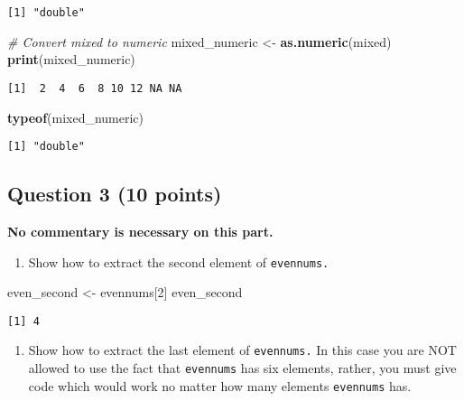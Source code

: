 \documentclass[
]{article}
\newenvironment{Shaded}{\begin{snugshade}}{\end{snugshade}}
\newcommand{\CommentTok}[1]{\textcolor[rgb]{0.56,0.35,0.01}{\textit{#1}}}
\newcommand{\DecValTok}[1]{\textcolor[rgb]{0.00,0.00,0.81}{#1}}
\newcommand{\FunctionTok}[1]{\textcolor[rgb]{0.13,0.29,0.53}{\textbf{#1}}}
\newcommand{\NormalTok}[1]{#1}
\newcommand{\OtherTok}[1]{\textcolor[rgb]{0.56,0.35,0.01}{#1}}
\providecommand{\tightlist}{%
  \setlength{\itemsep}{0pt}\setlength{\parskip}{0pt}}
\begin{document}
\begin{verbatim}
[1] "double"
\end{verbatim}

\begin{Shaded}
\begin{Highlighting}[]
\CommentTok{\# Convert mixed to numeric}
\NormalTok{mixed\_numeric }\OtherTok{\textless{}{-}} \FunctionTok{as.numeric}\NormalTok{(mixed)}
\FunctionTok{print}\NormalTok{(mixed\_numeric)}
\end{Highlighting}
\end{Shaded}

\begin{verbatim}
[1]  2  4  6  8 10 12 NA NA
\end{verbatim}

\begin{Shaded}
\begin{Highlighting}[]
\FunctionTok{typeof}\NormalTok{(mixed\_numeric)}
\end{Highlighting}
\end{Shaded}

\begin{verbatim}
[1] "double"
\end{verbatim}

\subsection{Question 3 (10 points)}\label{question-3-10-points}

\textbf{No commentary is necessary on this part.}

\begin{enumerate}
\def\labelenumi{\alph{enumi}.}
\tightlist
\item
  Show how to extract the second element of \texttt{evennums.}
\end{enumerate}

\begin{Shaded}
\begin{Highlighting}[]
\NormalTok{even\_second }\OtherTok{\textless{}{-}}\NormalTok{ evennums[}\DecValTok{2}\NormalTok{]}
\NormalTok{even\_second}
\end{Highlighting}
\end{Shaded}

\begin{verbatim}
[1] 4
\end{verbatim}

\begin{enumerate}
\def\labelenumi{\alph{enumi}.}
\setcounter{enumi}{1}
\tightlist
\item
  Show how to extract the last element of \texttt{evennums.} In this
  case you are NOT allowed to use the fact that \texttt{evennums} has
  six elements, rather, you must give code which would work no matter
  how many elements \texttt{evennums} has.
\end{enumerate}
\end{document}
